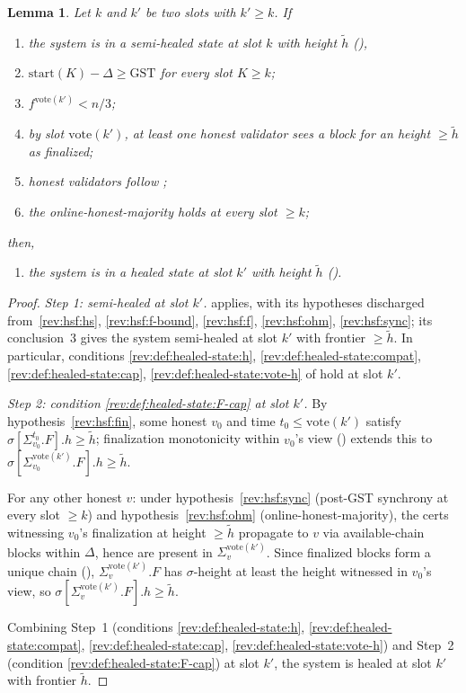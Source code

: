 \documentclass{article}
\newcommand{\start}{\ensuremath{\mathrm{start}}}
\newcommand{\vote}{\ensuremath{\mathrm{vote}}}
\newcommand{\GST}{\ensuremath{\mathrm{GST}}\xspace}
\newcommand{\comm}[1]{\ensuremath{\widetilde{#1}}}
\theoremstyle{plain}
\newtheorem{lemma}{Lemma}
\theoremstyle{definition}
\theoremstyle{remark}
\begin{document}
\begin{lemma}\label{rev:lem:healed-from-fin}
Let $k$ and $k'$ be two slots with $k' \geq k$.
If
\begin{enumerate}
  \item\label{rev:hsf:hs} the system is in a semi-healed state at slot $k$ with height $\comm{h}$ (),
  \item\label{rev:hsf:sync} $\start(K) - \Delta \geq \GST$ for every slot $K \geq k$;
  \item\label{rev:hsf:f-bound} $f^{\vote(k')}<n/3$;
  \item\label{rev:hsf:fin} by slot $\vote(k')$, at least one honest validator sees a block for an height $\geq \comm{h}$ as finalized;
  \item\label{rev:hsf:f} honest validators follow ;
  \item\label{rev:hsf:ohm} the online-honest-majority holds at every slot $\geq k$;
\end{enumerate}
then,
\begin{enumerate}
  \item the system is in a healed state at slot $k'$ with height $\comm{h}$ ().
\end{enumerate}
\end{lemma}

\begin{proof}
\emph{Step 1: semi-healed at slot $k'$.}
 applies, with its hypotheses discharged from~\ref{rev:hsf:hs}, \ref{rev:hsf:f-bound}, \ref{rev:hsf:f}, \ref{rev:hsf:ohm}, \ref{rev:hsf:sync};
its conclusion~3 gives the system semi-healed at slot $k'$ with frontier $\geq \comm{h}$.
In particular, conditions \ref{rev:def:healed-state:h}, \ref{rev:def:healed-state:compat}, \ref{rev:def:healed-state:cap}, \ref{rev:def:healed-state:vote-h} of  hold at slot $k'$.

\emph{Step 2: condition \ref{rev:def:healed-state:F-cap} at slot $k'$.}
By hypothesis~\ref{rev:hsf:fin}, some honest $v_0$ and time $t_0 \leq \vote(k')$ satisfy $\sigma[\Sigma_{v_0}^{t_0}.F].h \geq \comm{h}$;
finalization monotonicity within $v_0$'s view () extends this to $\sigma[\Sigma_{v_0}^{\vote(k')}.F].h \geq \comm{h}$.

For any other honest $v$: under hypothesis~\ref{rev:hsf:sync} (post-GST synchrony at every slot $\geq k$) and hypothesis~\ref{rev:hsf:ohm} (online-honest-majority), the certs witnessing $v_0$'s finalization at height $\geq \comm{h}$ propagate to $v$ via available-chain blocks within $\Delta$, hence are present in $\Sigma_v^{\vote(k')}$.
Since finalized blocks form a unique chain (), $\Sigma_v^{\vote(k')}.F$ has $\sigma$-height at least the height witnessed in $v_0$'s view, so $\sigma[\Sigma_v^{\vote(k')}.F].h \geq \comm{h}$.

Combining Step~1 (conditions \ref{rev:def:healed-state:h}, \ref{rev:def:healed-state:compat}, \ref{rev:def:healed-state:cap}, \ref{rev:def:healed-state:vote-h}) and Step~2 (condition \ref{rev:def:healed-state:F-cap}) at slot $k'$, the system is healed at slot $k'$ with frontier $\comm{h}$.
\end{proof}
\end{document}
